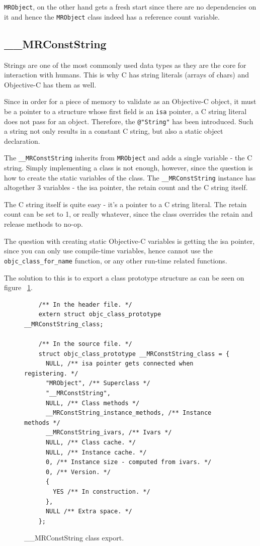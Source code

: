 \verb=MRObject=, on the other hand gets a fresh start since there are no dependencies on it and hence the \verb=MRObject= class indeed has a reference count variable.

\subsection{\_\_MRConstString}

Strings are one of the most commonly used data types as they are the core for interaction with humans. This is why C has string literals (arrays of chars) and Objective-C has them as well.

Since in order for a piece of memory to validate as an Objective-C object, it must be a pointer to a structure whose first field is an \verb=isa= pointer, a C string literal does not pass for an object. Therefore, the \verb=@"String"= has been introduced. Such a string not only results in a constant C string, but also a static object declaration.

The \verb=__MRConstString= inherits from \verb=MRObject= and adds a single variable - the C string. Simply implementing a class is not enough, however, since the question is how to create the static variables of the class. The \verb=__MRConstString= instance has altogether 3 variables - the isa pointer, the retain count and the C string itself.

The C string itself is quite easy - it's a pointer to a C string literal. The retain count can be set to 1, or really whatever, since the class overrides the retain and release methods to no-op.

The question with creating static Objective-C variables is getting the isa pointer, since you can only use compile-time variables, hence cannot use the \verb=objc_class_for_name= function, or any other run-time related functions.

The solution to this is to export a class prototype structure as can be seen on figure ~\ref{fig:mr_const_str_export}.

\begin{figure}[H]
  \begin{verbatim}
    /** In the header file. */
    extern struct objc_class_prototype __MRConstString_class;
    
    /** In the source file. */
    struct objc_class_prototype __MRConstString_class = {
      NULL, /** isa pointer gets connected when registering. */
      "MRObject", /** Superclass */
      "__MRConstString",
      NULL, /** Class methods */
      __MRConstString_instance_methods, /** Instance methods */
      __MRConstString_ivars, /** Ivars */
      NULL, /** Class cache. */
      NULL, /** Instance cache. */
      0, /** Instance size - computed from ivars. */
      0, /** Version. */
      {
        YES /** In construction. */
      },
      NULL /** Extra space. */
    };
  \end{verbatim}
  \centering{}
  \caption{\_\_MRConstString class export.}
  \label{fig:mr_const_str_export}
\end{figure}

